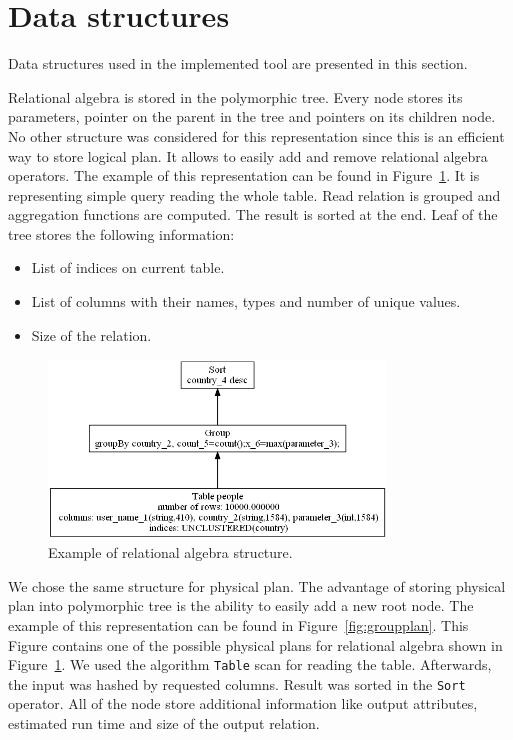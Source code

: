 \section{Data structures}

Data structures used in the implemented tool are presented in this section.

Relational algebra is stored in the polymorphic tree. Every node stores its parameters, pointer on the parent in the tree and pointers on its children node. No other structure was considered for this representation since this is an efficient way to store logical plan. It allows to easily add and remove relational algebra operators.
The example of this representation can be found in Figure~\ref{fig:groupalgebra}. It is representing simple query reading the whole table. Read relation is grouped and aggregation functions are computed. The result is sorted at the end. Leaf of the tree stores the following information:
\begin{itemize}
\item List of indices on current table.
\item List of columns with their names, types and number of unique values.
\item Size of the relation.
\end{itemize}
\begin{figure}[h!]
  \centering
    \includegraphics[width=0.8\textwidth]{groupalgebra}

      \caption{Example of relational algebra structure.}
          \label{fig:groupalgebra}
\end{figure}

We chose the same structure for physical plan. The advantage of storing physical plan into polymorphic tree is the ability to easily add a new root node. The example of this representation can be found in Figure~\ref{fig:groupplan}. This Figure contains one of the possible physical plans for relational algebra shown in Figure~\ref{fig:groupalgebra}. We used the algorithm \texttt{Table} scan for reading the table. Afterwards, the input was hashed by requested columns. Result was sorted in the \texttt{Sort} operator. All of the node store additional information like output attributes, estimated run time and size of the output relation.

